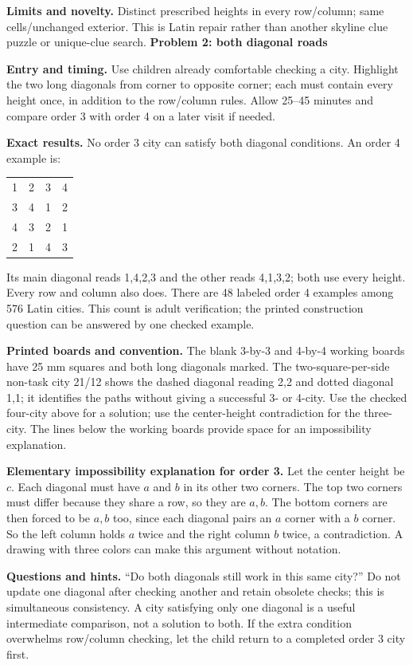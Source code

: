 \documentclass[11pt]{article}
\newcommand\lead[1]{\textbf{#1}\par}
\begin{document}
\textbf{Limits and novelty.} Distinct prescribed heights in every row/column; same cells/unchanged exterior. This is Latin repair rather than another skyline clue puzzle or unique-clue search.
\newpage
\lead{Problem 2: both diagonal roads}
\textbf{Entry and timing.} Use children already comfortable checking a city. Highlight the two long diagonals from corner to opposite corner; each must contain every height once, in addition to the row/column rules. Allow 25--45 minutes and compare order 3 with order 4 on a later visit if needed.

\textbf{Exact results.} No order 3 city can satisfy both diagonal conditions. An order 4 example is:

\begin{center}\begin{tabular}{cccc}
1&2&3&4\\3&4&1&2\\4&3&2&1\\2&1&4&3
\end{tabular}\end{center}

Its main diagonal reads 1,4,2,3 and the other reads 4,1,3,2; both use every height. Every row and column also does. There are 48 labeled order 4 examples among 576 Latin cities. This count is adult verification; the printed construction question can be answered by one checked example.

\textbf{Printed boards and convention.} The blank 3-by-3 and 4-by-4 working boards have 25 mm squares and both long diagonals marked. The two-square-per-side non-task city 21/12 shows the dashed diagonal reading 2,2 and dotted diagonal 1,1; it identifies the paths without giving a successful 3- or 4-city. Use the checked four-city above for a solution; use the center-height contradiction for the three-city. The lines below the working boards provide space for an impossibility explanation.

\textbf{Elementary impossibility explanation for order 3.} Let the center height be $c $. Each diagonal must have $a $ and $b $ in its other two corners. The top two corners must differ because they share a row, so they are $a,b $. The bottom corners are then forced to be $a,b $ too, since each diagonal pairs an $a $ corner with a $b $ corner. So the left column holds $a $ twice and the right column $b $ twice, a contradiction. A drawing with three colors can make this argument without notation.

\textbf{Questions and hints.} ``Do both diagonals still work in this same city?'' Do not update one diagonal after checking another and retain obsolete checks; this is simultaneous consistency. A city satisfying only one diagonal is a useful intermediate comparison, not a solution to both. If the extra condition overwhelms row/column checking, let the child return to a completed order 3 city first.
\end{document}

